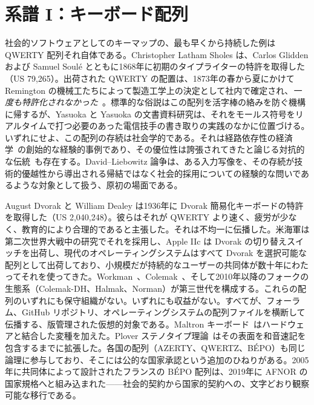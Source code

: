 \documentclass[10pt,letterpaper,twocolumn]{article}
\begin{document}
\section{系譜 I：キーボード配列}
\label{sec:lineage1}

社会的ソフトウェアとしてのキーマップの、最も早くから持続した例は QWERTY 配列それ自体である。Christopher Latham Sholes は、Carlos Glidden および Samuel Soulé とともに1868年に初期のタイプライターの特許を取得した（US 79{,}265）。出荷された QWERTY の配置は、1873年の春から夏にかけて Remington の機械工たちによって製造工学上の決定として社内で確定され、\emph{一度も特許化されなかった}~\citep{yasuoka2011prehistory}。標準的な俗説はこの配列を活字棒の絡みを防ぐ機構に帰するが、Yasuoka と Yasuoka の文書資料研究は、それをモールス符号をリアルタイムで打つ必要のあった電信技手の書き取りの実践のなかに位置づける。いずれにせよ、この配列の存続は社会学的である。それは経路依存性の経済学~\citep{david1985qwerty,arthur1989competing}の創始的な経験的事例であり、その優位性は誇張されてきたと論じる対抗的な伝統~\citep{liebowitz1990fable}も存在する。David--Liebowitz 論争は、ある入力写像を、その存続が技術的優越性から導出される帰結ではなく社会的採用についての経験的な問いであるような対象として扱う、原初の場面である。

August Dvorak と William Dealey は1936年に Dvorak 簡易化キーボードの特許を取得した（US 2{,}040{,}248）。彼らはそれが QWERTY より速く、疲労が少なく、教育的により合理的であると主張した。それは不均一に伝播した。米海軍は第二次世界大戦中の研究でそれを採用し、Apple IIc は Dvorak の切り替えスイッチを出荷し、現代のオペレーティングシステムはすべて Dvorak を選択可能な配列として出荷しており、小規模だが持続的なユーザーの共同体が数十年にわたってそれを使ってきた。Workman~\citep{bucao2010workman}、Colemak~\citep{coleman2006colemak}、そして2010年以降のフォークの生態系（Colemak-DH、Halmak、Norman）が第三世代を構成する。これらの配列のいずれにも保守組織がない。いずれにも収益がない。すべてが、フォーラム、GitHub リポジトリ、オペレーティングシステムの配列ファイルを横断して伝播する、版管理された仮想的対象である。Maltron キーボード~\citep{malt1977keyboard}はハードウェアと結合した変種を加えた。Plover ステノタイプ理論~\citep{knight2010plover}はその表面を和音速記を包含するまでに拡張した。各国の配列（AZERTY、QWERTZ、BÉPO）も同じ論理に参与しており、そこには公的な国家承認という追加のひねりがある。2005年に共同体によって設計されたフランスの BÉPO 配列は、2019年に AFNOR の国家規格へと組み込まれた——社会的契約から国家的契約への、文字どおり観察可能な移行である。
\end{document}
